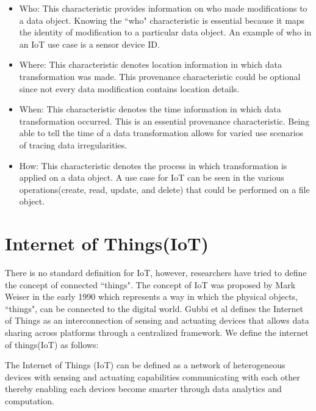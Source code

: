 \begin{itemize}

\item Who: This characteristic provides information on who made modifications to a data object. Knowing the ``who" characteristic is essential because it maps the identity of modification to a particular data object. An example of who in an IoT use case is a sensor device ID.

\item Where: This characteristic denotes location information in which data transformation was made. This provenance characteristic could be optional since not every data modification contains location details.

\item When: This characteristic denotes the time information in which data transformation occurred. This is an essential provenance characteristic. Being able to tell the time of a data transformation allows for varied use scenarios of tracing data irregularities.

\item How: This characteristic denotes the process in which transformation is applied on a data object. A use case for IoT can be seen in the various operations(create, read, update, and delete) that could be performed on a file object.

\end{itemize}


 
\section{Internet of Things(IoT)}
There is no standard definition for IoT, however, researchers have tried to define the concept of connected ``things". The concept of IoT was proposed by Mark Weiser in the early 1990 \cite{Mattern} which represents a way in which the physical objects, ``things", can be connected to the digital world. Gubbi et al \cite{park_provenance-based_2012} defines the Internet of Things as  an interconnection of sensing and actuating devices that allows data sharing across platforms through a centralized framework. We define the internet of things(IoT) as follows:

\begin{definition}
The Internet of Things (IoT) can be defined as a network of heterogeneous devices with sensing and actuating capabilities communicating with each other thereby enabling each devices become smarter through data analytics and computation. 

\end{definition}


